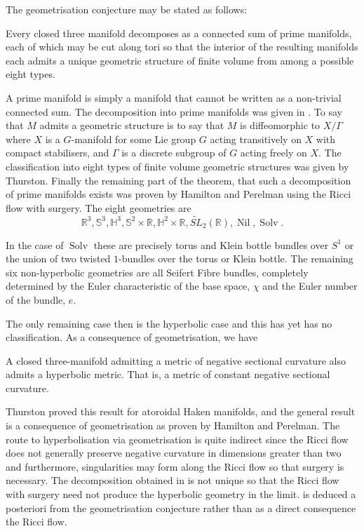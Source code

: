 \documentclass{cambridge7a}
\renewcommand{\~}{\tilde}
\renewcommand{\-}{\bar}
\newcommand{\R}{\mathbb{R}}
\renewcommand{\S}{\mathbb{S}}
\renewcommand{\H}{\mathbb{H}}
\newcommand{\8}{\infty}
\begin{document}
The geometrisation conjecture may be stated as follows:

\begin{thm}
\label{thm:geometrisation}

Every closed three manifold decomposes as a connected sum of prime manifolds, each of which may be cut along tori so that the interior of the resulting manifolds each admits a unique geometric structure of finite volume from among a possible eight types.
\end{thm}

A prime manifold is simply a manifold that cannot be written as a non-trivial connected sum. The decomposition into prime manifolds was given in \cite{MR0142125}. To say that \(M\) admits a geometric structure is to say that \(M\) is diffeomorphic to \(X/\Gamma\) where \(X\) is a \(G\)-manifold for some Lie group \(G\) acting transitively on \(X\) with compact stabilisers, and \(\Gamma\) is a discrete subgroup of \(G\) acting freely on \(X\). The classification into eight types of finite volume geometric structures was given by Thurston. Finally the remaining part of the theorem, that such a decomposition of prime manifolds exists was proven by Hamilton and Perelman using the Ricci flow with surgery. The eight geometries are
\[
\R^3, \S^3, \H^3, \S^2 \times \R, \H^2 \times \R, \widetilde{SL}_2(\R), \operatorname{Nil}, \operatorname{Solv}.
\]

In the case of \(\operatorname{Solv}\) these are precisely torus and Klein bottle bundles over \(S^1\) or the union of two twisted \(1\)-bundles over the torus or Klein bottle. The remaining six non-hyperbolic geometries are all Seifert Fibre bundles, completely determined by the Euler characteristic of the base space, \(\chi\) and the Euler number of the bundle, \(e\).

The only remaining case then is the hyperbolic case and this has yet has no classification. As a consequence of geometrisation, we have

\begin{thm}[Hyperbolisation]
\label{thm:hyperbolisation}

A closed three-manifold admitting a metric of negative sectional curvature also admits a hyperbolic metric. That is, a metric of constant negative sectional curvature.
\end{thm}

Thurston proved this result for atoroidal Haken manifolds, and the general result is a consequence of geometrisation as proven by Hamilton and Perelman. The route to hyperbolisation via geometrisation is quite indirect since the Ricci flow does not generally preserve negative curvature in dimensions greater than two and furthermore, singularities may form along the Ricci flow so that surgery is necessary. The decomposition obtained in  is not unique so that the Ricci flow with surgery need not produce the hyperbolic geometry in the limit.  is deduced a posteriori from the geometrisation conjecture rather than as a direct consequence the Ricci flow.
\end{document}
